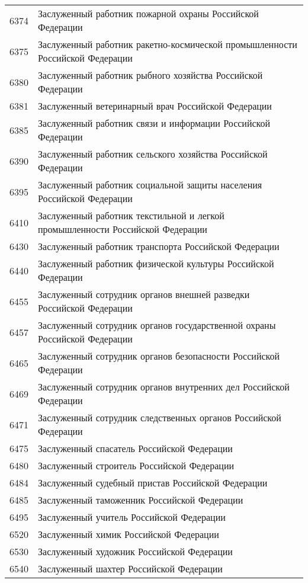 \documentclass[10pt, a4paper, titlepage]{article}
\begin{document}
\begin{center}
\begin{longtable}{rp{}}
        6374 & Заслуженный работник пожарной охраны Российской Федерации \\
        6375 & Заслуженный работник ракетно-космической промышленности Российской Федерации \\
        6380 & Заслуженный работник рыбного хозяйства Российской Федерации \\
        6381 & Заслуженный ветеринарный врач Российской Федерации \\
        6385 & Заслуженный работник связи и информации Российской Федерации \\
        6390 & Заслуженный работник сельского хозяйства Российской Федерации \\
        6395 & Заслуженный работник социальной защиты населения Российской Федерации \\
        6410 & Заслуженный работник текстильной и легкой промышленности Российской Федерации \\
        6430 & Заслуженный работник транспорта Российской Федерации \\
        6440 & Заслуженный работник физической культуры Российской Федерации \\
        6455 & Заслуженный сотрудник органов внешней разведки Российской Федерации \\
        6457 & Заслуженный сотрудник органов государственной охраны Российской Федерации \\
        6465 & Заслуженный сотрудник органов безопасности Российской Федерации \\
        6469 & Заслуженный сотрудник органов внутренних дел Российской Федерации \\
        6471 & Заслуженный сотрудник следственных органов Российской Федерации \\
        6475 & Заслуженный спасатель Российской Федерации \\
        6480 & Заслуженный строитель Российской Федерации \\
        6484 & Заслуженный судебный пристав Российской Федерации \\
        6485 & Заслуженный таможенник Российской Федерации \\
        6495 & Заслуженный учитель Российской Федерации \\
        6520 & Заслуженный химик Российской Федерации \\
        6530 & Заслуженный художник Российской Федерации \\
        6540 & Заслуженный шахтер Российской Федерации \\

\end{longtable}
\end{center}
\end{document}
